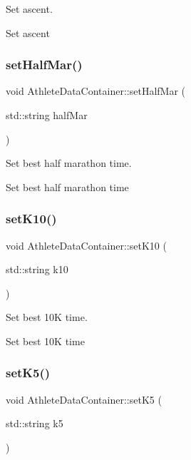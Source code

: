 Set ascent. 

Set ascent \mbox{\label{classAthleteDataContainer_ac18102b6a3f969b6fc79fbe0fc2dc03f}} 
\subsubsection{\texorpdfstring{setHalfMar()}{setHalfMar()}}
{\footnotesize\ttfamily void Athlete\+Data\+Container\+::set\+Half\+Mar (\begin{DoxyParamCaption}\item[{std\+::string}]{half\+Mar }\end{DoxyParamCaption})}



Set best half marathon time. 

Set best half marathon time \mbox{\label{classAthleteDataContainer_ad85c342fa362849ec7e1bfce00a6eedc}} 
\subsubsection{\texorpdfstring{setK10()}{setK10()}}
{\footnotesize\ttfamily void Athlete\+Data\+Container\+::set\+K10 (\begin{DoxyParamCaption}\item[{std\+::string}]{k10 }\end{DoxyParamCaption})}



Set best 10K time. 

Set best 10K time \mbox{\label{classAthleteDataContainer_acb7385bd747212344e540504a3ff8fd2}} 
\subsubsection{\texorpdfstring{setK5()}{setK5()}}
{\footnotesize\ttfamily void Athlete\+Data\+Container\+::set\+K5 (\begin{DoxyParamCaption}\item[{std\+::string}]{k5 }\end{DoxyParamCaption})}



